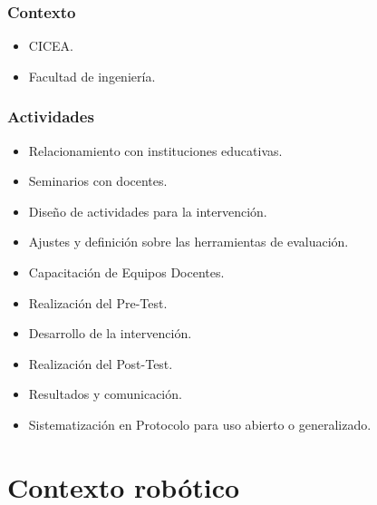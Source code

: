 \documentclass[spanish]{beamer}
\begin{document}
\begin{frame}
	\frametitle{Contexto}
	\begin{itemize}
		\item CICEA.
		\item Facultad de ingeniería.
	\end{itemize}
\end{frame}

\begin{frame}
	\frametitle{Actividades}
	\begin{itemize}
		\item Relacionamiento con instituciones educativas.
		\item Seminarios con docentes.
		\item Diseño de actividades para la intervención.
		\item Ajustes y definición sobre las herramientas de evaluación.
		\item Capacitación de Equipos Docentes.
		\item Realización del Pre-Test.
		\item Desarrollo de la intervención.
		\item Realización del Post-Test.
		\item Resultados y comunicación.
		\item Sistematización en Protocolo para uso abierto o generalizado.
	\end{itemize}
\end{frame}

\section{Contexto robótico}
\end{document}
